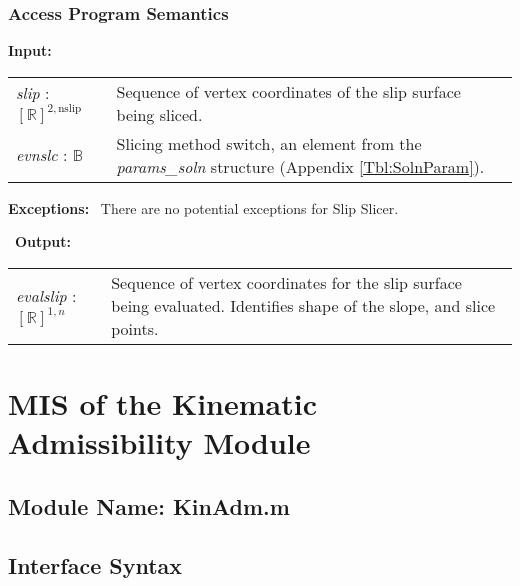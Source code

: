 \documentclass[12pt]{article}
\begin{document}
\subsubsection{Access Program Semantics}
\textbf{Input:} 
\renewcommand*{\arraystretch}{1.5}
\begin{longtable}{p{} p{}}
  \textit{slip} : $[\mathbb{R}]^{2,\text{nslip}}$ & Sequence of vertex
  coordinates of the slip surface being sliced. \\

  \textit{evnslc} : $\mathbb{B}$ & Slicing method switch, an element
  from the \textit{params\_soln} structure (Appendix
  \ref{Tbl:SolnParam}).\\
\end{longtable}

\noindent \textbf{Exceptions:} ~\newline\noindent There are no
potential exceptions for Slip Slicer.

~\newline\noindent \textbf{Output:}
\renewcommand*{\arraystretch}{1.5}
\begin{longtable}{p{} p{}}
  \textit{evalslip} : $[\mathbb{R}]^{1,n}$ & Sequence of vertex
  coordinates for the slip surface being evaluated. Identifies shape
  of the slope, and slice points. \\
\end{longtable}


\section{MIS of the Kinematic Admissibility
  Module} \label{sec:KinAdmMod}

\subsection{Module Name: KinAdm.m}

\subsection{Interface Syntax}
\end{document}
